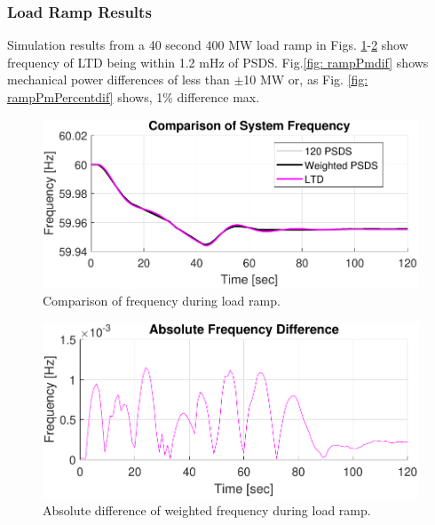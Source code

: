 \subsubsection{Load Ramp Results}
Simulation results from a 40 second 400 MW load ramp in Figs. \ref{fig: rampFcomp}-\ref{fig: rampFdif} show frequency of LTD being within 1.2 mHz of PSDS.
Fig.\ref{fig: rampPmdif} shows mechanical power differences of less than $\pm$10 MW or, as Fig. \ref{fig: rampPmPercentdif} shows, 1\% difference max.

\begin{figure}[!ht]
	\centering
	\includegraphics[width=\linewidth]{figures/miniWECC3ALTDrampF3}
	\caption{Comparison of frequency during load ramp.}
	\label{fig: rampFcomp}
\end{figure}

\begin{figure}[!ht]
	\centering
	\includegraphics[width=\linewidth]{figures/miniWECC3ALTDrampRelF}
	\caption{Absolute difference of weighted frequency during load ramp.}
	\label{fig: rampFdif}
\end{figure}

